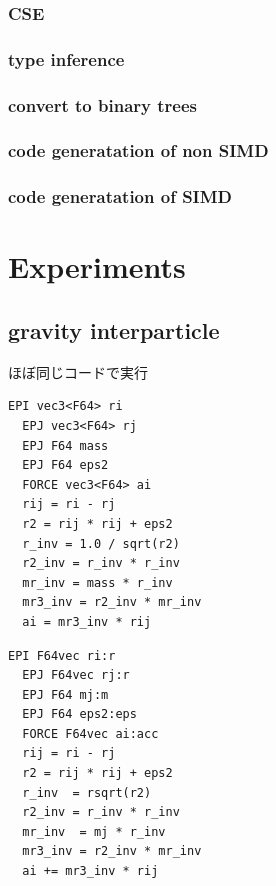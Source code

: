 \documentclass[ams, a4j]{U-AizuGT}
\begin{document}
\subsubsection{CSE}

\subsubsection{type inference}
\subsubsection{convert to binary trees}

\subsubsection{code generatation of non SIMD}


\subsubsection{code generatation of SIMD}




  
\section{Experiments}

\subsection{gravity interparticle}
ほぼ同じコードで実行


\begin{lstlisting}[frame=single, caption=Nbody-kernel.pyker, label=Nbody-kernel.pyker]
  EPI vec3<F64> ri
  EPJ vec3<F64> rj
  EPJ F64 mass
  EPJ F64 eps2
  FORCE vec3<F64> ai
  rij = ri - rj
  r2 = rij * rij + eps2
  r_inv = 1.0 / sqrt(r2)
  r2_inv = r_inv * r_inv
  mr_inv = mass * r_inv
  mr3_inv = r2_inv * mr_inv
  ai = mr3_inv * rij
  \end{lstlisting}

\begin{lstlisting}[frame=single, caption=Nbody-kernel.pikg, label=Nbody-kernel.pikg]
  EPI F64vec ri:r
  EPJ F64vec rj:r
  EPJ F64 mj:m
  EPJ F64 eps2:eps
  FORCE F64vec ai:acc
  rij = ri - rj
  r2 = rij * rij + eps2
  r_inv  = rsqrt(r2)
  r2_inv = r_inv * r_inv
  mr_inv  = mj * r_inv
  mr3_inv = r2_inv * mr_inv
  ai += mr3_inv * rij
  
\end{lstlisting}
\end{document}
